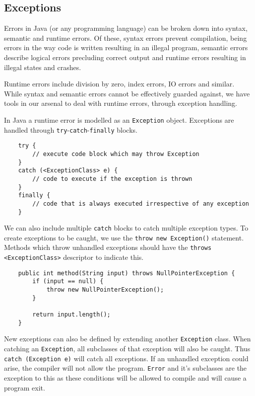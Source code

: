 \documentclass[12pt]{report}
\newcommand{\code}[1]{\lstinline{#1}}
\begin{document}
\begin{flushleft}
\section*{Exceptions}

Errors in Java (or any programming language) can be broken down into syntax,
semantic and runtime errors. Of these, syntax errors prevent compilation, being
errors in the way code is written resulting in an illegal program, semantic
errors describe logical errors precluding correct output and runtime errors
resulting in illegal states and crashes. \par
Runtime errors include division by zero, index errors, IO errors and similar.
While syntax and semantic errors cannot be effectively guarded against, we have
tools in our arsenal to deal with runtime errors, through exception handling.
\par
In Java a runtime error is modelled as an \code{Exception} object. Exceptions
are handled through \code{try}-\code{catch}-\code{finally} blocks.

\begin{lstlisting}
    try {
        // execute code block which may throw Exception
    }
    catch (<ExceptionClass> e) {
        // code to execute if the exception is thrown
    }
    finally {
        // code that is always executed irrespective of any exception
    }
\end{lstlisting}

We can also include multiple \code{catch} blocks to catch multiple exception
types. To create exceptions to be caught, we use the
\code{throw new Exception()} statement. Methods which throw unhandled
exceptions should have the \code{throws <ExceptionClass>} descriptor to
indicate this.

\begin{lstlisting}
    public int method(String input) throws NullPointerException {
        if (input == null) {
            throw new NullPointerException();
        }

        return input.length();
    }
\end{lstlisting}

New exceptions can also be defined by extending another \code{Exception} class.
When catching an \code{Exception}, all subclasses of that exception will also
be caught. Thus \code{catch (Exception e)} will catch all exceptions. If an
unhandled exception could arise, the compiler will not allow the program.
\code{Error} and it's subclasses are the exception to this as these conditions
will be allowed to compile and will cause a program exit.


\end{flushleft}
\end{document}
